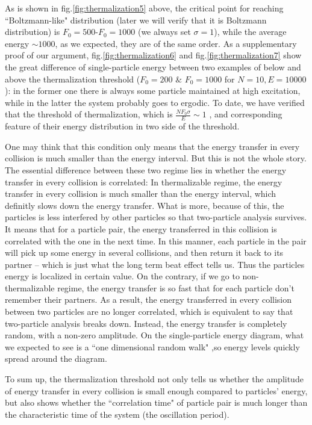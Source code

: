 \documentclass[aps,pre,twocolumn,groupedaddress]{revtex4-1}
\begin{document}
As is shown in fig.\ref{fig:thermalization5} above, the critical point for reaching ``Boltzmann-like" distribution (later we will verify that it is Boltzmann distribution) is $F_0=500$-$F_0=1000$ (we always set $\sigma=1$), while the average energy $\sim 1000$, as we expected, they are of the same order. As a supplementary proof of our argument, fig.\ref{fig:thermalization6} and fig.\ref{fig:thermalization7} show the great difference of single-particle energy between two examples of below and above the thermalization threshold ($F_0=200$ $\&$ $F_0=1000$ for $N=10, E=10000$): in the former one there is always some particle maintained at high excitation, while in the latter the system probably goes to ergodic. To date, we have verified that the threshold of thermalization, which is $\frac{NF_0\sigma}{E}\sim1 $ , and corresponding feature of their energy distribution in two side of the threshold.

One may think that this condition only means that the energy transfer in every collision is much smaller than the energy interval. But this is not the whole story. The essential difference between these two regime lies in whether the energy transfer in every collision is correlated: In thermalizable regime, the energy transfer in every collision is much smaller than the energy interval, which definitly slows down the energy transfer. What is more, because of this, the particles is less interfered by other particles so that two-particle analysis survives. It means that for a particle pair, the energy transferred in this collision is correlated with the one in the next time. In this manner, each particle in the pair will pick up some energy in several collisions, and then return it back to its partner -- which is just what the long term beat effect tells us. Thus the particles energy is localized in certain value. On the contrary, if we go to non-thermalizable regime, the energy transfer is so fast that for each particle don't remember their partners. As a result, the energy transferred in every collision between two particles are no longer correlated, which is equivalent to say that two-particle analysis breaks down. Instead, the energy transfer is completely random, with a non-zero amplitude. On the single-particle energy diagram, what we expected to see is a ``one dimensional random walk" ,so energy levels quickly spread around the diagram.

To sum up, the thermalization threshold not only tells us whether the amplitude of energy transfer in every collision is small enough compared to particles' energy, but also shows whether the ``correlation time" of particle pair is much longer than the characteristic time of the system (the oscillation period).  
\end{document}

